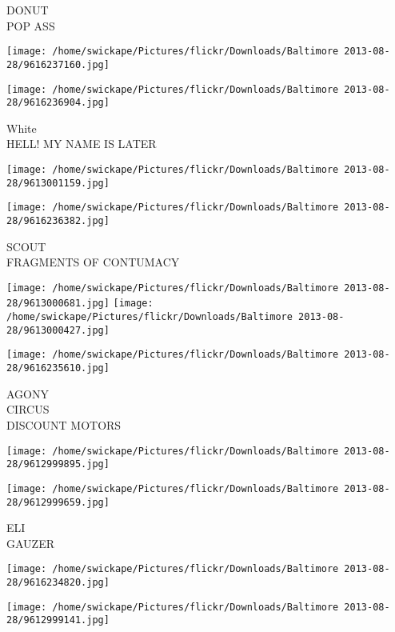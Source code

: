 \documentclass[10pt,letterpaper]{article}
\begin{document}
DONUT\\
POP ASS\\
\pagebreak

\texttt{[image: /home/swickape/Pictures/flickr/Downloads/Baltimore 2013-08-28/9616237160.jpg]}

\vspace{0.25in}
\texttt{[image: /home/swickape/Pictures/flickr/Downloads/Baltimore 2013-08-28/9616236904.jpg]}

White\\
HELL! MY NAME IS LATER\\
\pagebreak

\texttt{[image: /home/swickape/Pictures/flickr/Downloads/Baltimore 2013-08-28/9613001159.jpg]}

\vspace{0.25in}
\texttt{[image: /home/swickape/Pictures/flickr/Downloads/Baltimore 2013-08-28/9616236382.jpg]}

SCOUT\\
FRAGMENTS OF CONTUMACY\\
\pagebreak

\texttt{[image: /home/swickape/Pictures/flickr/Downloads/Baltimore 2013-08-28/9613000681.jpg]}
\texttt{[image: /home/swickape/Pictures/flickr/Downloads/Baltimore 2013-08-28/9613000427.jpg]}

\vspace{0.25in}
\texttt{[image: /home/swickape/Pictures/flickr/Downloads/Baltimore 2013-08-28/9616235610.jpg]}

AGONY\\
CIRCUS\\
DISCOUNT MOTORS\\
\pagebreak

\texttt{[image: /home/swickape/Pictures/flickr/Downloads/Baltimore 2013-08-28/9612999895.jpg]}

\vspace{0.25in}
\texttt{[image: /home/swickape/Pictures/flickr/Downloads/Baltimore 2013-08-28/9612999659.jpg]}

ELI\\
GAUZER\\
\pagebreak

\texttt{[image: /home/swickape/Pictures/flickr/Downloads/Baltimore 2013-08-28/9616234820.jpg]}

\vspace{0.25in}
\texttt{[image: /home/swickape/Pictures/flickr/Downloads/Baltimore 2013-08-28/9612999141.jpg]}
\end{document}
